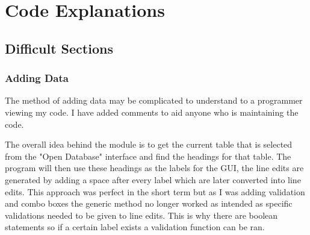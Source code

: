 \section{Code Explanations}

\subsection{Difficult Sections}

\subsubsection{Adding Data}

The method of adding data may be complicated to understand to a programmer viewing my code. I have added comments to aid anyone who is maintaining the code.

The overall idea behind the module is to get the current table that is selected from the  "Open Database" interface and find the headings for that table. The program will then use these headings as the labels for the GUI, the line edits are generated by adding a space after every label which are later converted into line edits. This approach was perfect in the short term but as I was adding validation and combo boxes the generic method no longer worked as intended as specific validations needed to be given to line edits. This is why there are boolean statements so if a certain label exists a validation function can be ran.

